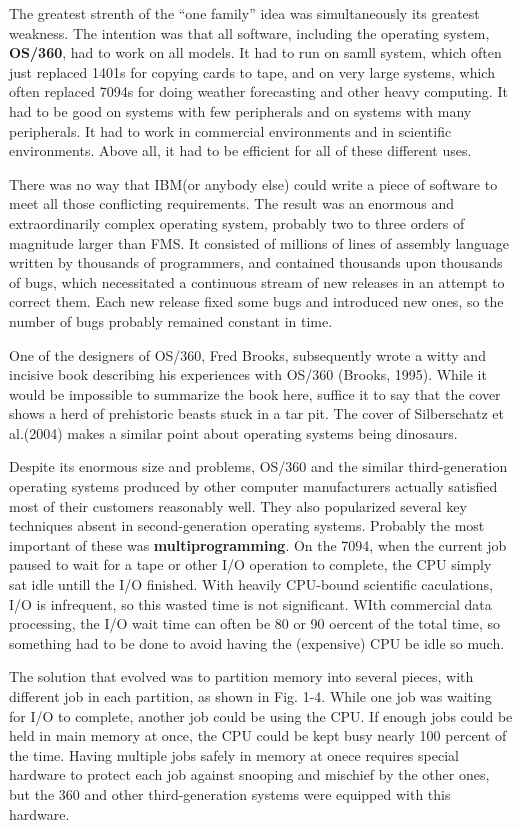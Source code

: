 \documentclass{book}
\newcommand {\kw}  [1] {\textbf{#1}}
\begin{document}
The greatest strenth of the ``one family'' idea was simultaneously its greatest weakness.
The intention was that all software, including the operating system, \kw{OS/360}, had to work on all models.
It had to run on samll system, which often just replaced 1401s for copying cards to tape, 
and on very large systems, which often replaced 7094s for doing weather forecasting and other heavy computing.
It had to be good on systems with few peripherals and on systems with many peripherals.
It had to work in commercial environments and in scientific environments.
Above all, it had to be efficient for all of these different uses.

There was no way that IBM(or anybody else) could write a piece of software to meet all those conflicting requirements.
The result was an enormous and extraordinarily complex operating system, probably two to three orders of magnitude larger than FMS.
It consisted of millions of lines of assembly language written by thousands of programmers, 
and contained thousands upon thousands of bugs, which necessitated a continuous stream of new releases in an attempt to correct them.
Each new release fixed some bugs and introduced new ones, so the number of bugs probably remained constant in time.

One of the designers of OS/360, Fred Brooks, subsequently wrote a witty and incisive book describing his experiences with OS/360 (Brooks, 1995).
While it would be impossible to summarize the book here, suffice it to say that the cover shows a herd of prehistoric beasts stuck in a tar pit.
The cover of Silberschatz et al.(2004) makes a similar point about operating systems being dinosaurs.

Despite its enormous size and problems, OS/360 and the similar third-generation operating systems produced by other computer manufacturers 
actually satisfied most of their customers reasonably well.
They also popularized several key techniques absent in second-generation operating systems.
Probably the most important of these was \kw{multiprogramming}.
On the 7094, when the current job paused to wait for a tape or other I/O operation to complete, the CPU simply sat idle untill the I/O finished.
With heavily CPU-bound scientific caculations, I/O is infrequent, so this wasted time is not significant.
WIth commercial data processing, the I/O wait time can often be 80 or 90 oercent of the total time, 
so something had to be done to avoid having the (expensive) CPU be idle so much.

The solution that evolved was to partition memory into several pieces, with different job in each partition, as shown in Fig. 1-4.
While one job was waiting for I/O to complete, another job could be using the CPU.
If enough jobs could be held in main memory at once, the CPU could be kept busy nearly 100 percent of the time.
Having multiple jobs safely in memory at onece requires special hardware to protect each job against snooping and mischief by the other ones,
but the 360 and other third-generation systems were equipped with this hardware.
\end{document}
